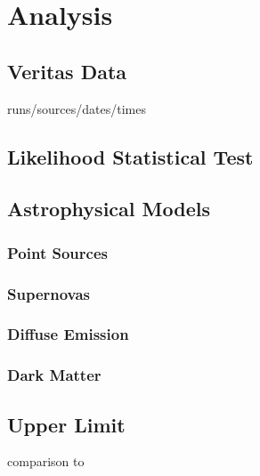 \cleartooddpage[\thispagestyle{empty}]
\chapter{Analysis}

\section{Veritas Data}
runs/sources/dates/times

\section{Likelihood Statistical Test}

\section{Astrophysical Models}

\subsection{Point Sources}

\subsection{Supernovas}

\subsection{Diffuse Emission}

\subsection{Dark Matter}

\section{Upper Limit}

comparison to 

